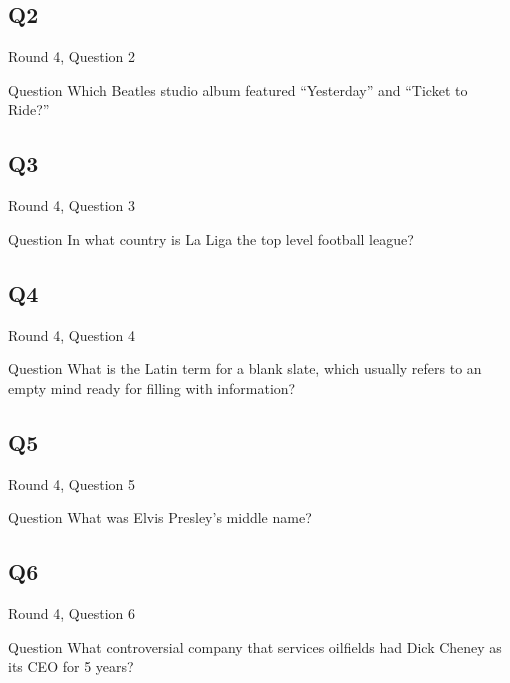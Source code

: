 \documentclass[11pt]{beamer}
\begin{document}
\subsection*{Q2}
\begin{frame}[t]{Round 4, Question 2}
\vspace{2em}
\begin{block}{Question}
Which Beatles studio album featured ``Yesterday'' and ``Ticket to Ride?''
\end{block}
\end{frame}
    

\subsection*{Q3}
\begin{frame}[t]{Round 4, Question 3}
\vspace{2em}
\begin{block}{Question}
In what country is La Liga the top level football league\@?
\end{block}
\end{frame}
    

\subsection*{Q4}
\begin{frame}[t]{Round 4, Question 4}
\vspace{2em}
\begin{block}{Question}
What is the Latin term for a blank slate, which usually refers to an empty mind ready for filling with information\@?
\end{block}
\end{frame}
    

\subsection*{Q5}
\begin{frame}[t]{Round 4, Question 5}
\vspace{2em}
\begin{block}{Question}
What was Elvis Presley's middle name\@?
\end{block}
\end{frame}
    

\subsection*{Q6}
\begin{frame}[t]{Round 4, Question 6}
\vspace{2em}
\begin{block}{Question}
What controversial company that services oilfields had Dick Cheney as its CEO for 5 years\@?
\end{block}
\end{frame}
    
\end{document}
